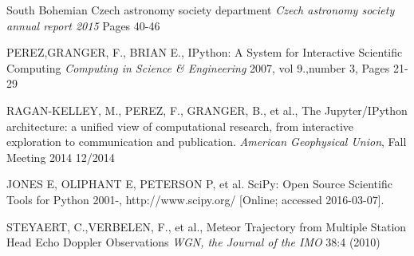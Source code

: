\documentclass[twoside]{ctuthesis}
\theoremstyle{plain}
\theoremstyle{definition}
\theoremstyle{note}
\begin{document}
\begin{thebibliography}{99}
South Bohemian Czech astronomy society department
\emph{Czech astronomy society annual report 2015}
Pages 40-46

PEREZ,GRANGER, F.,  BRIAN E.,
IPython: A System for Interactive Scientific Computing
\emph{Computing in Science \& Engineering}
2007, vol 9.,number 3,  Pages 21-29

RAGAN-KELLEY, M., PEREZ, F., GRANGER, B., et al.,
The Jupyter/IPython architecture: a unified view of computational research, from interactive exploration to communication and publication.
\emph{American Geophysical Union}, Fall Meeting 2014
12/2014

JONES E, OLIPHANT E, PETERSON P, et al.
SciPy: Open Source Scientific Tools for Python
2001-, http://www.scipy.org/ [Online; accessed 2016-03-07].

STEYAERT, C.,VERBELEN, F., et al.,
Meteor Trajectory from Multiple Station Head Echo Doppler Observations
\emph{WGN, the Journal of the IMO} 38:4 (2010)

\end{thebibliography}
\end{document}

